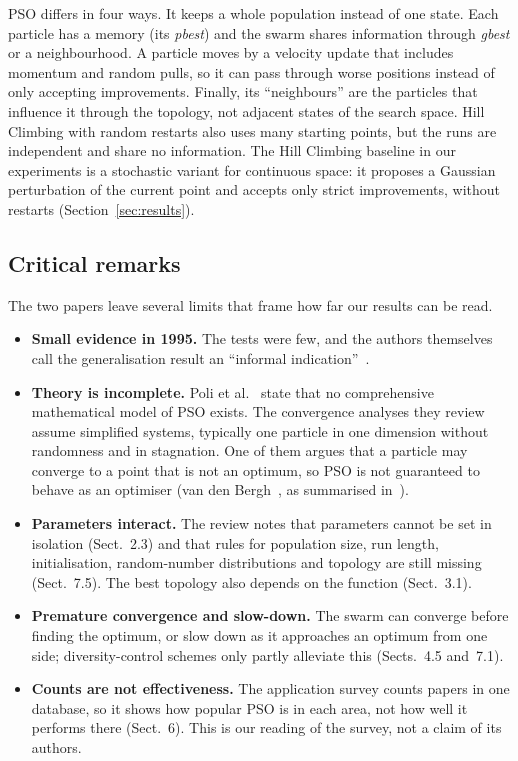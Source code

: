 \documentclass[11pt,a4paper]{article}
\newcommand{\tn}[1]{\textit{#1}}
\begin{document}
PSO differs in four ways. It keeps a whole population instead of one state. Each particle has a memory (its \tn{pbest}) and the swarm shares information through \tn{gbest} or a neighbourhood. A particle moves by a velocity update that includes momentum and random pulls, so it can pass through worse positions instead of only accepting improvements. Finally, its ``neighbours'' are the particles that influence it through the topology, not adjacent states of the search space. Hill Climbing with random restarts also uses many starting points, but the runs are independent and share no information. The Hill Climbing baseline in our experiments is a stochastic variant for continuous space: it proposes a Gaussian perturbation of the current point and accepts only strict improvements, without restarts (Section~\ref{sec:results}).

\subsection{Critical remarks}
The two papers leave several limits that frame how far our results can be read.
\begin{itemize}
\item \textbf{Small evidence in 1995.} The tests were few, and the authors themselves call the generalisation result an ``informal indication''~\cite[p.~1947]{kennedy1995}.
\item \textbf{Theory is incomplete.} Poli et al.~\cite[Sect.~5]{poli2007} state that no comprehensive mathematical model of PSO exists. The convergence analyses they review assume simplified systems, typically one particle in one dimension without randomness and in stagnation. One of them argues that a particle may converge to a point that is not an optimum, so PSO is not guaranteed to behave as an optimiser (van den Bergh~\cite{vandenbergh2002}, as summarised in~\cite[Sect.~5.1]{poli2007}).
\item \textbf{Parameters interact.} The review notes that parameters cannot be set in isolation (Sect.~2.3) and that rules for population size, run length, initialisation, random-number distributions and topology are still missing (Sect.~7.5). The best topology also depends on the function (Sect.~3.1).
\item \textbf{Premature convergence and slow-down.} The swarm can converge before finding the optimum, or slow down as it approaches an optimum from one side; diversity-control schemes only partly alleviate this (Sects.~4.5 and~7.1).
\item \textbf{Counts are not effectiveness.} The application survey counts papers in one database, so it shows how popular PSO is in each area, not how well it performs there (Sect.~6). This is our reading of the survey, not a claim of its authors.
\end{itemize}
\end{document}
